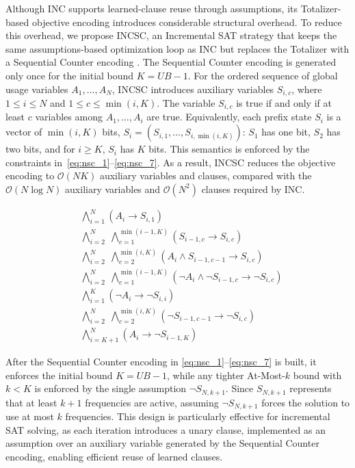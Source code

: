 Although INC supports learned-clause reuse through assumptions, its Totalizer-based objective encoding introduces considerable structural overhead. To reduce this overhead, we propose INCSC, an Incremental SAT strategy that keeps the same assumptions-based optimization loop as INC but replaces the Totalizer with a Sequential Counter encoding \cite{Sinz2005}. The Sequential Counter encoding is generated only once for the initial bound $K=UB-1$. 
For the ordered sequence of global usage variables $A_1,\dots,A_N$, INCSC introduces auxiliary variables $S_{i,c}$, where $1 \le i \le N$ and $1 \le c \le \min(i,K)$. The variable $S_{i,c}$ is true if and only if at least $c$ variables among $A_1,\dots,A_i$ are true. Equivalently, each prefix state $S_i$ is a vector of $\min(i,K)$ bits, $S_i=(S_{i,1},\dots,S_{i,\min(i,K)})$: $S_1$ has one bit, $S_2$ has two bits, and for $i \ge K$, $S_i$ has $K$ bits. This semantics is enforced by the constraints in~\eqref{eq:nsc_1}--\eqref{eq:nsc_7}. As a result, INCSC reduces the objective encoding to $\mathcal{O}(NK)$ auxiliary variables and clauses, compared with the $\mathcal{O}(N \log N)$ auxiliary variables and $\mathcal{O}(N^2)$ clauses required by INC.

\begin{align}
    & \bigwedge_{i=1}^{N} \left( A_i \rightarrow S_{i,1} \right) \label{eq:nsc_1} \\
    & \bigwedge_{i=2}^{N} \;\bigwedge_{c=1}^{\min(i-1,K)} \left( S_{i-1,c} \rightarrow S_{i,c} \right) \label{eq:nsc_2} \\
    & \bigwedge_{i=2}^{N} \;\bigwedge_{c=2}^{\min(i,K)} \left( A_i \land S_{i-1,c-1} \rightarrow S_{i,c} \right) \label{eq:nsc_3} \\
    & \bigwedge_{i=2}^{N} \;\bigwedge_{c=1}^{\min(i-1,K)} \left( \neg A_i \land \neg S_{i-1,c} \rightarrow \neg S_{i,c} \right) \label{eq:nsc_4} \\
    & \bigwedge_{i=1}^{K} \left( \neg A_i \rightarrow \neg S_{i,i} \right) \label{eq:nsc_5} \\
    & \bigwedge_{i=2}^{N} \;\bigwedge_{c=2}^{\min(i,K)} \left( \neg S_{i-1,c-1} \rightarrow \neg S_{i,c} \right) \label{eq:nsc_6} \\
    & \bigwedge_{i=K+1}^{N} \left( A_i \rightarrow \neg S_{i-1,K} \right) \label{eq:nsc_7}
\end{align}

After the Sequential Counter encoding in \eqref{eq:nsc_1}--\eqref{eq:nsc_7} is built, it enforces the initial bound $K=UB-1$, while any tighter At-Most-$k$ bound with $k<K$ is enforced by the single assumption $\neg S_{N,k+1}$.
Since $S_{N,k+1}$ represents that at least $k+1$ frequencies are active, assuming $\neg S_{N,k+1}$ forces the solution to use at most $k$ frequencies. 
This design is particularly effective for incremental SAT solving, as each iteration introduces a unary clause, implemented as an assumption over an auxiliary variable generated by the Sequential Counter encoding, enabling efficient reuse of learned clauses.

